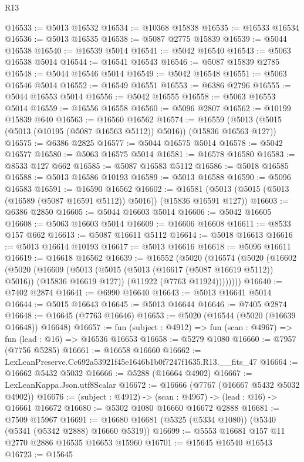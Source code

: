 \begin{lexlean}{R13}
\begin{coremodule}
@16533 := @5013 @16532
@16534 := @10368 @15838
@16535 := @16533 @16534
@16536 := @5013 @16535
@16538 := @5087 @2775 @15839
@16539 := @5044 @16538
@16540 := @16539 @5014
@16541 := @5042 @16540
@16543 := @5063 @16538 @5014
@16544 := @16541 @16543
@16546 := @5087 @15839 @2785
@16548 := @5044 @16546 @5014
@16549 := @5042 @16548
@16551 := @5063 @16546 @5014
@16552 := @16549 @16551
@16553 := @6386 @2796
@16555 := @5044 @16553 @5014
@16556 := @5042 @16555
@16558 := @5063 @16553 @5014
@16559 := @16556 @16558
@16560 := @5096 @2807
@16562 := @10199 @15839 @640
@16563 := @16560 @16562
@16574 := @16559 (@5013 (@5015 (@5013 (@10195 (@5087 @16563 @5112)) @5016)) (@15836 @16563 @127))
@16575 := @6386 @2825
@16577 := @5044 @16575 @5014
@16578 := @5042 @16577
@16580 := @5063 @16575 @5014
@16581 := @16578 @16580
@16583 := @8533 @127 @662
@16585 := @5087 @16583 @5112
@16586 := @5018 @16585
@16588 := @5013 @16586 @10193
@16589 := @5013 @16588
@16590 := @5096 @16583
@16591 := @16590 @16562
@16602 := @16581 (@5013 (@5015 (@5013 (@16589 (@5087 @16591 @5112)) @5016)) (@15836 @16591 @127))
@16603 := @6386 @2850
@16605 := @5044 @16603 @5014
@16606 := @5042 @16605
@16608 := @5063 @16603 @5014
@16609 := @16606 @16608
@16611 := @8533 @157 @662
@16613 := @5087 @16611 @5112
@16614 := @5018 @16613
@16616 := @5013 @16614 @10193
@16617 := @5013 @16616
@16618 := @5096 @16611
@16619 := @16618 @16562
@16639 := @16552
    (@5020
      (@16574
        (@5020
          (@16602
            (@5020
              (@16609
                (@5013 (@5015 (@5013 (@16617 (@5087 @16619 @5112)) @5016)) (@15836 @16619 @127))
                (@11922 (@7763 @11924))))))))
@16640 := @7402 @2874
@16641 := @6990 @16640
@16643 := @5013 @16641 @5014
@16644 := @5015 @16643
@16645 := @5013 @16644
@16646 := @7405 @2874
@16648 := @16645 (@7763 @16646)
@16653 := @5020 (@16544 (@5020 (@16639 @16648)) @16648)
@16657 := fun (subject : @4912) => fun (scan : @4967) => fun (lead : @16) => @16536 @16653
@16658 := @5279 @1080
@16660 := @7957 (@7756 @5285)
@16661 := @16658 @16660
@16662 := LexLeanPreserve.Cc692a53921f45e1646b1b0f7247f1635.R13.__fits_47
@16664 := @16662 @5432 @5032
@16666 := @5288 (@16664 @4902)
@16667 := LexLeanKappa.Json.utf8Scalar
@16672 := @16666 (@7767 (@16667 @5432 @5032 @4902))
@16676 := (subject : @4912) -> (scan : @4967) -> (lead : @16) -> @16661 @16672
@16680 := @5302 @1080 @16660 @16672 @2888
@16681 := @7509 @15967
@16691 := @16680 @16681 (@5325 (@5334 @1080)) (@5340 (@5341 (@5342 @2888) @16660 @5319))
@16699 := @5553 @16681 @157 @11 @2770 @2886 @16535 @16653 @15960
@16701 := @15645 @16540 @16543
@16723 := @15645

\end{coremodule}
\end{lexlean}
